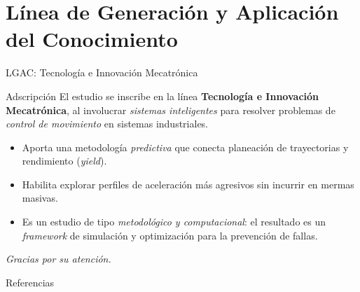 \documentclass[en,16:9,navbarinline,bigfoot]{sdqbeamer}
\begin{document}
\section{Línea de Generación y Aplicación del Conocimiento}

\begin{frame}{LGAC: Tecnología e Innovación Mecatrónica}
    \begin{purpleblock}{Adscripción}
        El estudio se inscribe en la línea \textbf{Tecnología e Innovación Mecatrónica}, al involucrar \emph{sistemas inteligentes} para resolver problemas de \emph{control de movimiento} en sistemas industriales.
    \end{purpleblock}
    \vspace{0.2cm}
    \begin{itemize}
        \item Aporta una metodología \emph{predictiva} que conecta planeación de trayectorias y rendimiento (\textit{yield}).
        \item Habilita explorar perfiles de aceleración más agresivos sin incurrir en mermas masivas.
        \item Es un estudio de tipo \emph{metodológico y computacional}: el resultado es un \emph{framework} de simulación y optimización para la prevención de fallas.
    \end{itemize}
    \vspace{0.4cm}
    \begin{center}
    \textit{Gracias por su atención.}
    \end{center}
\end{frame}

\appendix
\beginbackup
\begin{frame}[allowframebreaks]{Referencias}
\printbibliography
\end{frame}
\backupend
\end{document}
